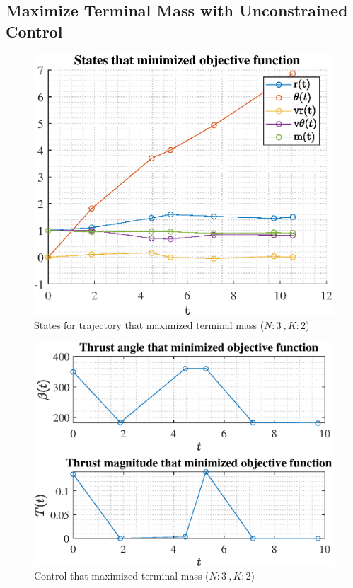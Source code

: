 \documentclass[]{article}
\begin{document}
	\subsection{Maximize Terminal Mass with Unconstrained Control}
\begin{figure}
	\centering
	\includegraphics[scale=0.75]{states_N3_K2_C2_mf.eps}
	\caption{States for trajectory that maximized terminal mass (\(N:3\ , K:2\))}
	\label{fig:states_N3_K2_C2_mf}
\end{figure}
\begin{figure}
	\centering
	\includegraphics[scale=0.75]{control_N3_K2_C2_mf.eps}
	\caption{Control that maximized terminal mass (\(N:3\ , K:2\))}
	\label{fig:control_N3_K2_C2_mf}
\end{figure}
\end{document}

